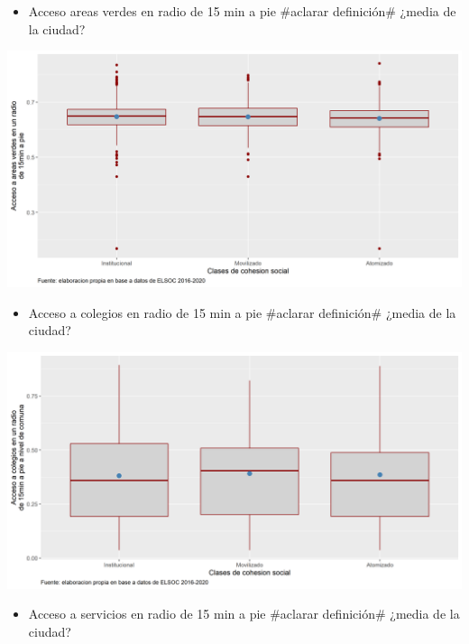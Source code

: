 \documentclass[
  12pt,
]{book}
\providecommand{\tightlist}{%
  \setlength{\itemsep}{0pt}\setlength{\parskip}{0pt}}
\begin{document}
\begin{itemize}
\tightlist
\item
  Acceso areas verdes en radio de 15 min a pie \#aclarar definición\# ¿media de la ciudad?
\end{itemize}

\begin{center}\includegraphics[width=1\linewidth,height=1\textheight]{output/graphs/clase-acver} \end{center}

\begin{itemize}
\tightlist
\item
  Acceso a colegios en radio de 15 min a pie \#aclarar definición\# ¿media de la ciudad?
\end{itemize}

\begin{center}\includegraphics[width=1\linewidth,height=1\textheight]{output/graphs/clase-aced} \end{center}

\begin{itemize}
\tightlist
\item
  Acceso a servicios en radio de 15 min a pie \#aclarar definición\# ¿media de la ciudad?
\end{itemize}
\end{document}
